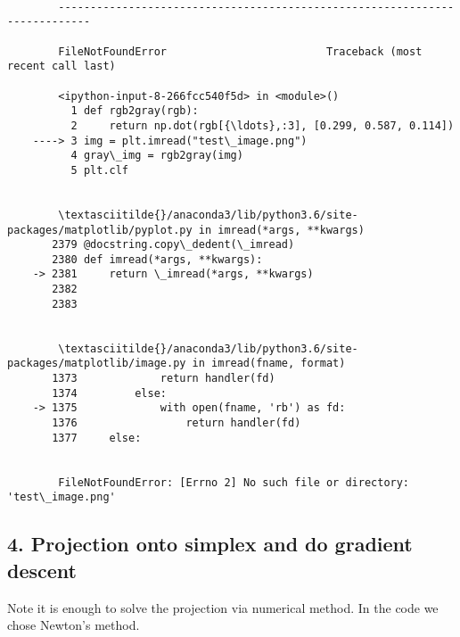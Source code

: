 \documentclass[11pt]{article}
\begin{document}
    \begin{Verbatim}[commandchars=\\\{\}]

        ---------------------------------------------------------------------------

        FileNotFoundError                         Traceback (most recent call last)

        <ipython-input-8-266fcc540f5d> in <module>()
          1 def rgb2gray(rgb):
          2     return np.dot(rgb[{\ldots},:3], [0.299, 0.587, 0.114])
    ----> 3 img = plt.imread("test\_image.png")
          4 gray\_img = rgb2gray(img)
          5 plt.clf


        \textasciitilde{}/anaconda3/lib/python3.6/site-packages/matplotlib/pyplot.py in imread(*args, **kwargs)
       2379 @docstring.copy\_dedent(\_imread)
       2380 def imread(*args, **kwargs):
    -> 2381     return \_imread(*args, **kwargs)
       2382 
       2383 


        \textasciitilde{}/anaconda3/lib/python3.6/site-packages/matplotlib/image.py in imread(fname, format)
       1373             return handler(fd)
       1374         else:
    -> 1375             with open(fname, 'rb') as fd:
       1376                 return handler(fd)
       1377     else:


        FileNotFoundError: [Errno 2] No such file or directory: 'test\_image.png'

    \end{Verbatim}

    \subsection{4. Projection onto simplex and do gradient
descent}\label{projection-onto-simplex-and-do-gradient-descent}

Note it is enough to solve the projection via numerical method. In the
code we chose Newton's method.
\end{document}
